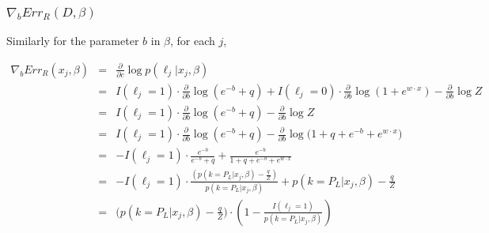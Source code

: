 \documentclass{article}
\begin{document}
\subsubsection{$ \nabla_{b}{Err_R (D, \beta)}$}

Similarly for the parameter $b$ in $\beta$, for each $j$,

\begin{eqnarray*}
\nabla_{b}{Err_R (x_j, \beta)} &=& \frac{\partial}{\partial c}\log{p(\ell_j | x_j, \beta)} \\
&=& I(\ell_j=1) \cdot \frac{\partial}{\partial b}
		\log{(e^{-b} + q)} +
    I(\ell_j=0) \cdot \frac{\partial}{\partial b}
		\log{ \left( 1 + e^{w \cdot x} \right) }
		- \frac{\partial}{\partial b}
		 \log{Z} \\
&=& I(\ell_j=1) \cdot \frac{\partial}{\partial b}
		\log{(e^{-b} + q)} -
		\frac{\partial}{\partial b}
		 \log{Z} \\
 &=& I(\ell_j=1) \cdot \frac{\partial}{\partial b}
		\log{  \left( e^{-b} + q \right) }
		- \frac{\partial}{\partial b}
		 \log{\bigg(
			1 + q + e^{-b} + e^{w \cdot x}
		\bigg)} \\
 &=& - I(\ell_j=1) \cdot
		\frac{e^{-b}}{e^{-b} + q}
		+
		 \frac{e^{-b}}{
			1 + q + e^{-b} + e^{w \cdot x}
		} \\
 &=& - I(\ell_j=1) \cdot
		\frac{ \left( p(k=P_L | x_j,\beta) - \frac{q}{Z} \right) }{p(k=P_L | x_j,\beta)}
		+
		 p(k=P_L | x_j,\beta) - \frac{q}{Z} \\
 &=& \Big( p(k=P_L | x_j,\beta) - \frac{q}{Z} \Big) \cdot \left( 
		1 - \frac{ I(\ell_j=1)}{p(k=P_L | x_j,\beta)}
	  \right) 
\end{eqnarray*}
\end{document}
